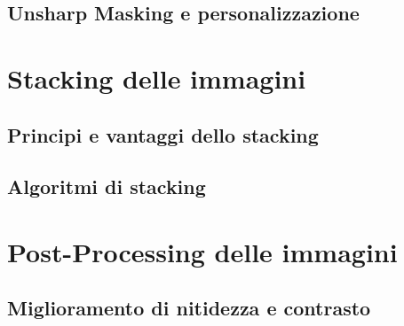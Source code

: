 \subsection{Unsharp Masking e personalizzazione} \label{subsec:unsharp_mask}

\section{Stacking delle immagini} \label{sec:stacking}

\subsection{Principi e vantaggi dello stacking} \label{subsec:stacking_intro}

\subsection{Algoritmi di stacking} \label{subsec:atacking_algo}

\section{Post-Processing delle immagini} \label{sec:postprocess}

\subsection{Miglioramento di nitidezza e contrasto} \label{subsec:contrast}

\cleardoublepage